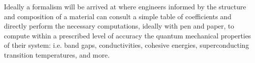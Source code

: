
Ideally a formalism will be arrived at where engineers informed by the structure and composition 
of a material can consult a simple table of coefficients and directly perform the 
necessary computations, ideally with pen and paper, to compute within a prescribed
level of accuracy the quantum mechanical properties of their system: i.e. band gaps, 
conductivities, cohesive energies, superconducting transition temperatures, and more.


